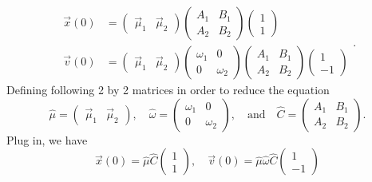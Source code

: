 \documentclass[12pt]{article}%
\begin{document}
	\begin{equation}
	\begin{aligned}
	\vec{x}\left(0\right) &= 
	\begin{pmatrix}\vec{\mu}_{1}&\vec{\mu}_{2}\end{pmatrix}
	\begin{pmatrix}A_{1}&B_{1}\\A_{2}&B_{2}\end{pmatrix}
	\begin{pmatrix}1\\1\end{pmatrix}
	\\
	\vec{v}\left(0\right) &= 
	\begin{pmatrix}\vec{\mu}_{1}&\vec{\mu}_{2}\end{pmatrix}
	\begin{pmatrix}\omega_1&0\\0&\omega_2\end{pmatrix}
	\begin{pmatrix}A_{1}&B_{1}\\A_{2}&B_{2}\end{pmatrix}
	\begin{pmatrix}1\\-1\end{pmatrix}
	\end{aligned}.
	\end{equation}
	Defining following 2 by 2 matrices in order to reduce the equation
	\begin{equation}
	\hat{\mu} = \begin{pmatrix}\vec{\mu}_1&\vec{\mu}_2\end{pmatrix}, \quad 
	\hat{\omega} = \begin{pmatrix}\omega_1&0\\0&\omega_2\end{pmatrix},\quad \text{and} \quad
	\hat{C} = \begin{pmatrix}A_{1}&B_{1}\\A_{2}&B_{2}\end{pmatrix}.
	\end{equation}
	Plug in, we have
	\begin{equation}
	\vec{x}\left(0\right) = 
	\hat{\mu}\hat{C}
	\begin{pmatrix}1\\1\end{pmatrix},\quad
	\vec{v}\left(0\right) = 
	\hat{\mu}\hat{\omega}\hat{C}
	\begin{pmatrix}1\\-1\end{pmatrix}
	\end{equation}
\end{document}

